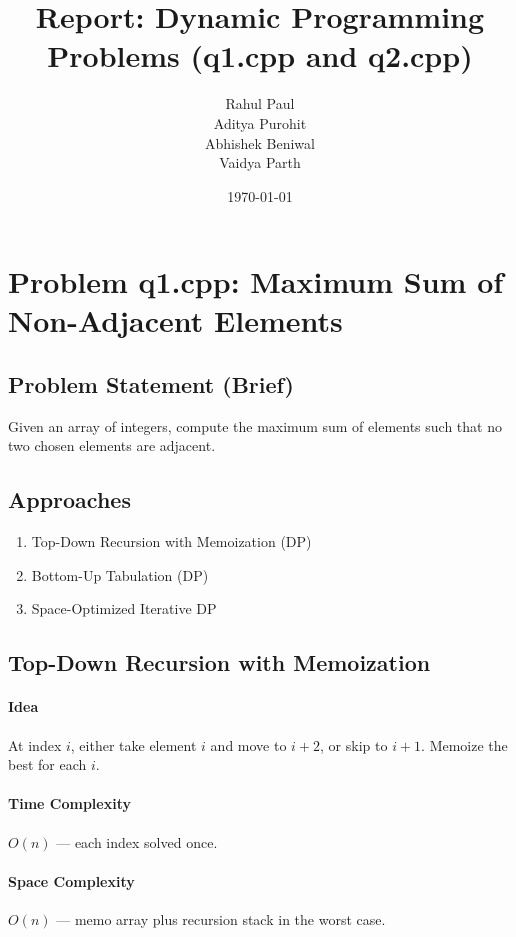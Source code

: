 \documentclass[11pt,a4paper]{article}
\title{Report: Dynamic Programming Problems (q1.cpp and q2.cpp)}
\author{\small Rahul Paul \\
Aditya Purohit \\
Abhishek Beniwal \\
Vaidya Parth}
\date{\today}
\begin{document}
\maketitle
{}

\tableofcontents
\vspace{1em}

\section{Problem q1.cpp: Maximum Sum of Non-Adjacent Elements}
\subsection{Problem Statement (Brief)}
Given an array of integers, compute the maximum sum of elements such that no two chosen elements are adjacent.

\subsection{Approaches}
\begin{enumerate}[leftmargin=*]
  \item Top-Down Recursion with Memoization (DP)
  \item Bottom-Up Tabulation (DP)
  \item Space-Optimized Iterative DP
\end{enumerate}

\subsection{Top-Down Recursion with Memoization}
\paragraph{Idea} At index \(i\), either take element \(i\) and move to \(i+2\), or skip to \(i+1\). Memoize the best for each \(i\).

\paragraph{Time Complexity} \(O(n)\) — each index solved once.

\paragraph{Space Complexity} \(O(n)\) — memo array plus recursion stack in the worst case.
\end{document}
